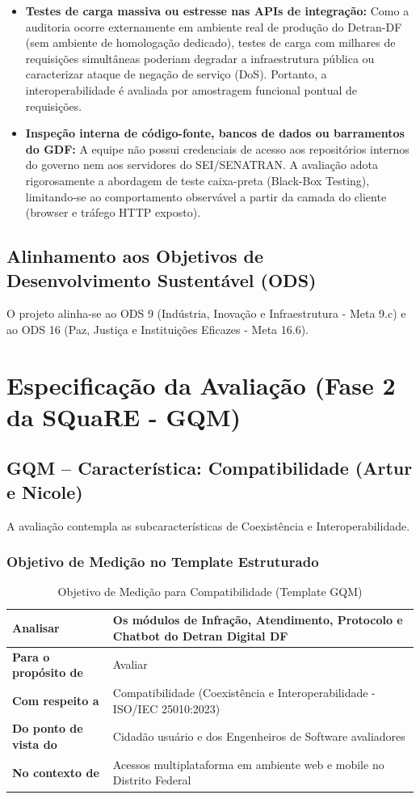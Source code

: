 \documentclass[12pt]{article}
\begin{document}
\begin{enumerate}
\begin{itemize}
        \item \textbf{Testes de carga massiva ou estresse nas APIs de integração:} Como a auditoria ocorre externamente em ambiente real de produção do Detran-DF (sem ambiente de homologação dedicado), testes de carga com milhares de requisições simultâneas poderiam degradar a infraestrutura pública ou caracterizar ataque de negação de serviço (DoS). Portanto, a interoperabilidade é avaliada por amostragem funcional pontual de requisições.
        \item \textbf{Inspeção interna de código-fonte, bancos de dados ou barramentos do GDF:} A equipe não possui credenciais de acesso aos repositórios internos do governo nem aos servidores do SEI/SENATRAN. A avaliação adota rigorosamente a abordagem de teste caixa-preta (Black-Box Testing), limitando-se ao comportamento observável a partir da camada do cliente (browser e tráfego HTTP exposto).
    \end{itemize}
\end{enumerate}

\subsection{Alinhamento aos Objetivos de Desenvolvimento Sustentável (ODS)}
O projeto alinha-se ao ODS 9 (Indústria, Inovação e Infraestrutura - Meta 9.c) e ao ODS 16 (Paz, Justiça e Instituições Eficazes - Meta 16.6).

\section{Especificação da Avaliação (Fase 2 da SQuaRE - GQM)}

\subsection{GQM -- Característica: Compatibilidade (Artur e Nicole)}
A avaliação contempla as subcaracterísticas de Coexistência e Interoperabilidade.

\subsubsection{Objetivo de Medição no Template Estruturado}
\begin{table}[h]
\centering
\caption{Objetivo de Medição para Compatibilidade (Template GQM)}
\begin{tabular}{|l|p{10cm}|}
\hline
\textbf{Analisar} & Os módulos de Infração, Atendimento, Protocolo e Chatbot do Detran Digital DF \\ \hline
\textbf{Para o propósito de} & Avaliar \\ \hline
\textbf{Com respeito a} & Compatibilidade (Coexistência e Interoperabilidade - ISO/IEC 25010:2023) \\ \hline
\textbf{Do ponto de vista do} & Cidadão usuário e dos Engenheiros de Software avaliadores \\ \hline
\textbf{No contexto de} & Acessos multiplataforma em ambiente web e mobile no Distrito Federal \\ \hline
\end{tabular}
\end{table}
\end{document}
